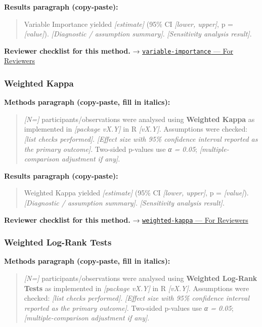 \documentclass[
]{article}
\begin{document}
\textbf{Results paragraph (copy-paste):}

\begin{quote}
Variable Importance yielded \emph{{[}estimate{]}} (95\% CI
\emph{{[}lower, upper{]}}, p = \emph{{[}value{]}}). \emph{{[}Diagnostic
/ assumption summary{]}}. \emph{{[}Sensitivity analysis result{]}}.
\end{quote}

\textbf{Reviewer checklist for this method.} →
\href{../chapters/13-ml/variable-importance.Rmd\#for-reviewers}{\texttt{variable-importance}
--- For Reviewers}

\subsubsection{Weighted Kappa}\label{weighted-kappa}

\textbf{Methods paragraph (copy-paste, fill in italics):}

\begin{quote}
\emph{{[}N={]}} participants/observations were analysed using
\textbf{Weighted Kappa} as implemented in \emph{{[}package vX.Y{]}} in R
\emph{{[}vX.Y{]}}. Assumptions were checked: \emph{{[}list checks
performed{]}}. \emph{{[}Effect size with 95\% confidence interval
reported as the primary outcome{]}}. Two-sided p-values use \emph{α =
0.05}; \emph{{[}multiple-comparison adjustment if any{]}}.
\end{quote}

\textbf{Results paragraph (copy-paste):}

\begin{quote}
Weighted Kappa yielded \emph{{[}estimate{]}} (95\% CI \emph{{[}lower,
upper{]}}, p = \emph{{[}value{]}}). \emph{{[}Diagnostic / assumption
summary{]}}. \emph{{[}Sensitivity analysis result{]}}.
\end{quote}

\textbf{Reviewer checklist for this method.} →
\href{../chapters/14-clinical/weighted-kappa.Rmd\#for-reviewers}{\texttt{weighted-kappa}
--- For Reviewers}

\subsubsection{Weighted Log-Rank Tests}\label{weighted-log-rank-tests}

\textbf{Methods paragraph (copy-paste, fill in italics):}

\begin{quote}
\emph{{[}N={]}} participants/observations were analysed using
\textbf{Weighted Log-Rank Tests} as implemented in \emph{{[}package
vX.Y{]}} in R \emph{{[}vX.Y{]}}. Assumptions were checked: \emph{{[}list
checks performed{]}}. \emph{{[}Effect size with 95\% confidence interval
reported as the primary outcome{]}}. Two-sided p-values use \emph{α =
0.05}; \emph{{[}multiple-comparison adjustment if any{]}}.
\end{quote}
\end{document}
